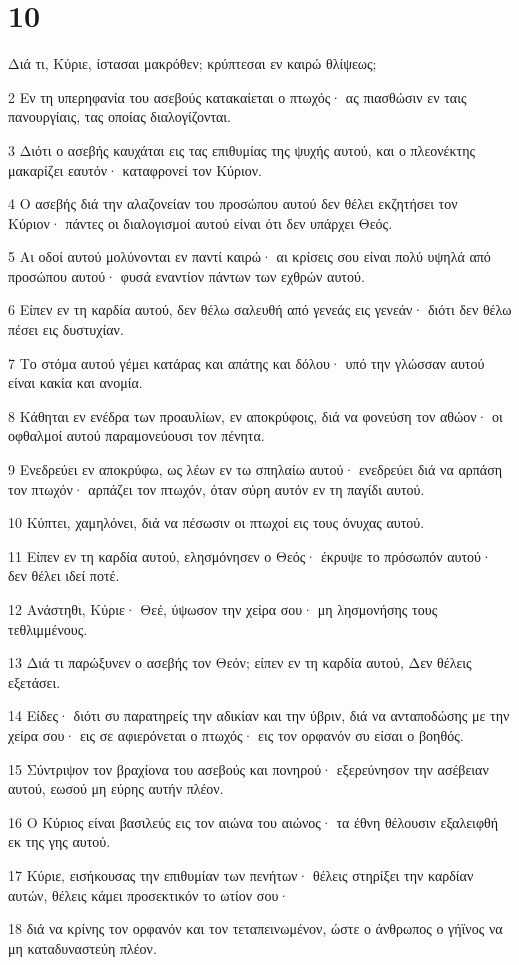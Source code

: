 \chapter{10}

\par Διά τι, Κύριε, ίστασαι μακρόθεν; κρύπτεσαι εν καιρώ θλίψεως;
\par 2 Εν τη υπερηφανία του ασεβούς κατακαίεται ο πτωχός· ας πιασθώσιν εν ταις πανουργίαις, τας οποίας διαλογίζονται.
\par 3 Διότι ο ασεβής καυχάται εις τας επιθυμίας της ψυχής αυτού, και ο πλεονέκτης μακαρίζει εαυτόν· καταφρονεί τον Κύριον.
\par 4 Ο ασεβής διά την αλαζονείαν του προσώπου αυτού δεν θέλει εκζητήσει τον Κύριον· πάντες οι διαλογισμοί αυτού είναι ότι δεν υπάρχει Θεός.
\par 5 Αι οδοί αυτού μολύνονται εν παντί καιρώ· αι κρίσεις σου είναι πολύ υψηλά από προσώπου αυτού· φυσά εναντίον πάντων των εχθρών αυτού.
\par 6 Είπεν εν τη καρδία αυτού, δεν θέλω σαλευθή από γενεάς εις γενεάν· διότι δεν θέλω πέσει εις δυστυχίαν.
\par 7 Το στόμα αυτού γέμει κατάρας και απάτης και δόλου· υπό την γλώσσαν αυτού είναι κακία και ανομία.
\par 8 Κάθηται εν ενέδρα των προαυλίων, εν αποκρύφοις, διά να φονεύση τον αθώον· οι οφθαλμοί αυτού παραμονεύουσι τον πένητα.
\par 9 Ενεδρεύει εν αποκρύφω, ως λέων εν τω σπηλαίω αυτού· ενεδρεύει διά να αρπάση τον πτωχόν· αρπάζει τον πτωχόν, όταν σύρη αυτόν εν τη παγίδι αυτού.
\par 10 Κύπτει, χαμηλόνει, διά να πέσωσιν οι πτωχοί εις τους όνυχας αυτού.
\par 11 Είπεν εν τη καρδία αυτού, ελησμόνησεν ο Θεός· έκρυψε το πρόσωπόν αυτού· δεν θέλει ιδεί ποτέ.
\par 12 Ανάστηθι, Κύριε· Θεέ, ύψωσον την χείρα σου· μη λησμονήσης τους τεθλιμμένους.
\par 13 Διά τι παρώξυνεν ο ασεβής τον Θεόν; είπεν εν τη καρδία αυτού, Δεν θέλεις εξετάσει.
\par 14 Είδες· διότι συ παρατηρείς την αδικίαν και την ύβριν, διά να ανταποδώσης με την χείρα σου· εις σε αφιερόνεται ο πτωχός· εις τον ορφανόν συ είσαι ο βοηθός.
\par 15 Σύντριψον τον βραχίονα του ασεβούς και πονηρού· εξερεύνησον την ασέβειαν αυτού, εωσού μη εύρης αυτήν πλέον.
\par 16 Ο Κύριος είναι βασιλεύς εις τον αιώνα του αιώνος· τα έθνη θέλουσιν εξαλειφθή εκ της γης αυτού.
\par 17 Κύριε, εισήκουσας την επιθυμίαν των πενήτων· θέλεις στηρίξει την καρδίαν αυτών, θέλεις κάμει προσεκτικόν το ωτίον σου·
\par 18 διά να κρίνης τον ορφανόν και τον τεταπεινωμένον, ώστε ο άνθρωπος ο γήϊνος να μη καταδυναστεύη πλέον.

